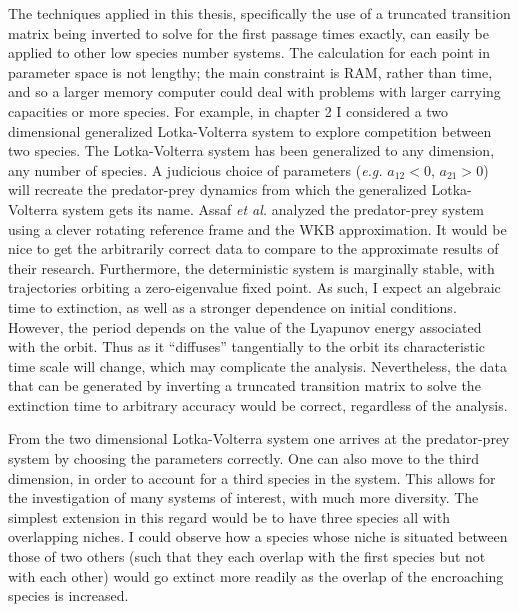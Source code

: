 The techniques applied in this thesis, specifically the use of a truncated transition matrix being inverted to solve for the first passage times exactly, can easily be applied to other low species number systems. 
The calculation for each point in parameter space is not lengthy; the main constraint is RAM, rather than time, and so a larger memory computer could deal with problems with larger carrying capacities or more species. %
For example, in chapter 2 I considered a two dimensional generalized Lotka-Volterra system to explore competition between two species. 
The Lotka-Volterra system has been generalized to any dimension, any number of species. 
A judicious choice of parameters (\emph{e.g.} $a_{12}<0$, $a_{21}>0$) will recreate the predator-prey dynamics from which the generalized Lotka-Volterra system gets its name. 
Assaf \emph{et al.} \cite{??Assaf??} analyzed the predator-prey system using a clever rotating reference frame and the WKB approximation. 
It would be nice to get the arbitrarily correct data to compare to the approximate results of their research. 
Furthermore, the deterministic system is marginally stable, with trajectories orbiting a zero-eigenvalue fixed point. As such, I expect an algebraic time to extinction, as well as a stronger dependence on initial conditions. 
However, the period depends on the value of the Lyapunov energy associated with the orbit. Thus as it ``diffuses'' tangentially to the orbit its characteristic time scale will change, which may complicate the analysis. 
Nevertheless, the data that can be generated by inverting a truncated transition matrix to solve the extinction time to arbitrary accuracy would be correct, regardless of the analysis. 

From the two dimensional Lotka-Volterra system one arrives at the predator-prey system by choosing the parameters correctly. 
One can also move to the third dimension, in order to account for a third species in the system. 
This allows for the investigation of many systems of interest, with much more diversity. 
The simplest extension in this regard would be to have three species all with overlapping niches. 
I could observe how a species whose niche is situated between those of two others (such that they each overlap with the first species but not with each other) would go extinct more readily as the overlap of the encroaching species is increased. 

